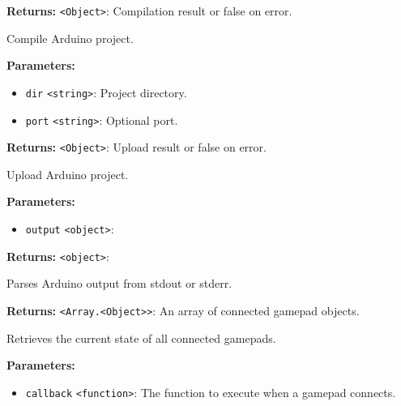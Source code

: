 \documentclass[12pt,a4paper]{article}
\begin{document}
\noindent \textbf{Returns:} \texttt{<Object>}: Compilation result or false on error.

\noindent Compile Arduino project.

\vspace{5mm}
\noindent {}


\noindent \textbf{Parameters:}
\begin{itemize}
  \item \texttt{dir} \texttt{<string>}: Project directory.
  \item \texttt{port} \texttt{<string>}: Optional port.
\end{itemize}

\noindent \textbf{Returns:} \texttt{<Object>}: Upload result or false on error.

\noindent Upload Arduino project.

\vspace{5mm}
\noindent {}


\noindent \textbf{Parameters:}
\begin{itemize}
  \item \texttt{output} \texttt{<object>}: 
\end{itemize}

\noindent \textbf{Returns:} \texttt{<object>}: 

\noindent Parses Arduino output from stdout or stderr.

\vspace{5mm}
\noindent {}


\noindent \textbf{Returns:} \texttt{<Array.<Object>>}: An array of connected gamepad objects.

\noindent Retrieves the current state of all connected gamepads.

\vspace{5mm}
\noindent {}


\noindent \textbf{Parameters:}
\begin{itemize}
  \item \texttt{callback} \texttt{<function>}: The function to execute when a gamepad connects.
\end{itemize}
\end{document}
